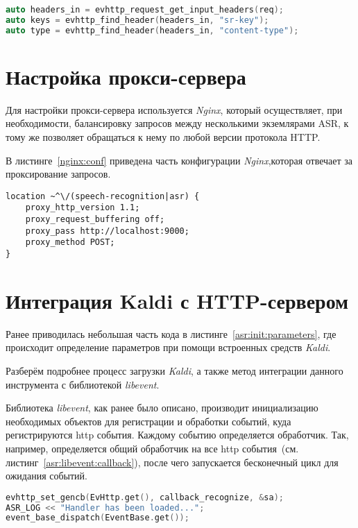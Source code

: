 \begin{lstlisting}[caption={Чтение заголовков},label={asr:http:headers},language=C++]
auto headers_in = evhttp_request_get_input_headers(req);
auto keys = evhttp_find_header(headers_in, "sr-key");
auto type = evhttp_find_header(headers_in, "content-type");

\end{lstlisting}

\section{Настройка прокси-сервера}

Для настройки прокси-сервера используется \textit{Nginx}, который осуществляет,
при необходимости, балансировку запросов между несколькими экземлярами ASR, к
тому же позволяет обращаться к нему по любой версии протокола HTTP.

В листинге~\ref{nginx:conf} приведена часть конфигурации \textit{Nginx},которая
отвечает за проксирование запросов.

\begin{lstlisting}[caption={Пример конфигурации Nginx},label={nginx:conf}]
location ~^\/(speech-recognition|asr) {
    proxy_http_version 1.1;
    proxy_request_buffering off;
    proxy_pass http://localhost:9000;
    proxy_method POST;
}

\end{lstlisting}

\section{Интеграция Kaldi с HTTP-сервером}
Ранее приводилась небольшая часть кода в листинге~\ref{asr:init:parameters}, где
происходит определение параметров при помощи встроенных средств \textit{Kaldi}.

Разберём подробнее процесс загрузки \textit{Kaldi}, а также метод интеграции
данного инструмента с библиотекой \textit{libevent}.

Библиотека \textit{libevent}, как ранее было описано, производит инициализацию
необходимых объектов для регистрации и обработки событий, куда регистрируются
http события. Каждому событию определяется обработчик. Так, например, определяется
общий обработчик на все http события~(см. листинг~\ref{asr:libevent:callback}),
после чего запускается бесконечный цикл для ожидания событий.

\begin{lstlisting}[caption={Создание обработчика событий},label=asr:libevent:callback,language=C++]
evhttp_set_gencb(EvHttp.get(), callback_recognize, &sa);
ASR_LOG << "Handler has been loaded...";
event_base_dispatch(EventBase.get());
\end{lstlisting}

